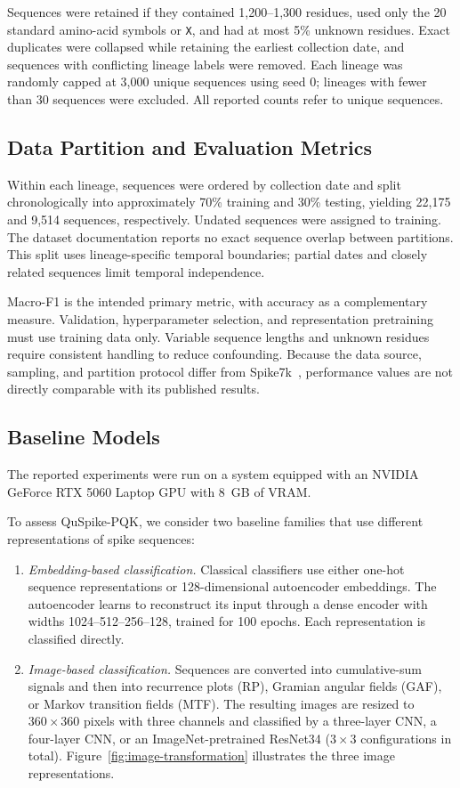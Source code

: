 \documentclass[conference]{IEEEtran}
\begin{document}
Sequences were retained if they contained 1,200--1,300 residues, used only the 20 standard amino-acid symbols or \texttt{X}, and had at most 5\% unknown residues. Exact duplicates were collapsed while retaining the earliest collection date, and sequences with conflicting lineage labels were removed. Each lineage was randomly capped at 3,000 unique sequences using seed 0; lineages with fewer than 30 sequences were excluded. All reported counts refer to unique sequences.

\subsection{Data Partition and Evaluation Metrics}

Within each lineage, sequences were ordered by collection date and split chronologically into approximately 70\% training and 30\% testing, yielding 22,175 and 9,514 sequences, respectively. Undated sequences were assigned to training. The dataset documentation reports no exact sequence overlap between partitions. This split uses lineage-specific temporal boundaries; partial dates and closely related sequences limit temporal independence.

Macro-F1 is the intended primary metric, with accuracy as a complementary measure. Validation, hyperparameter selection, and representation pretraining must use training data only. Variable sequence lengths and unknown residues require consistent handling to reduce confounding. Because the data source, sampling, and partition protocol differ from Spike7k~\cite{murad2024snn}, performance values are not directly comparable with its published results.

\subsection{Baseline Models}
\label{sec:baselines}

The reported experiments were run on a system equipped with an NVIDIA GeForce RTX 5060 Laptop GPU with 8~GB of VRAM.

To assess QuSpike-PQK, we consider two baseline families that use different representations of spike sequences:
\begin{enumerate}
    \item \textit{Embedding-based classification.} Classical classifiers use either one-hot sequence representations or 128-dimensional autoencoder embeddings. The autoencoder learns to reconstruct its input through a dense encoder with widths 1024--512--256--128, trained for 100 epochs. Each representation is classified directly.
    \item \textit{Image-based classification.} Sequences are converted into cumulative-sum signals and then into recurrence plots (RP), Gramian angular fields (GAF), or Markov transition fields (MTF). The resulting images are resized to $360\times360$ pixels with three channels and classified by a three-layer CNN, a four-layer CNN, or an ImageNet-pretrained ResNet34 ($3\times3$ configurations in total). Figure~\ref{fig:image-transformation} illustrates the three image representations.
\end{enumerate}
\end{document}
